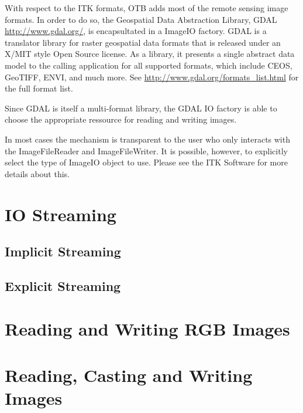 With respect to the ITK formats, OTB adds most of the remote sensing
image formats. In order to do so, the Geospatial Data Abstraction Library, GDAL
      \url{http://www.gdal.org/}, is encapsultated in a ImageIO
      factory. GDAL is a translator library for raster
      geospatial data formats that is released under an X/MIT style
      Open Source license. As a library, it presents a single abstract
      data model to the calling application for all supported formats,
      which include CEOS, GeoTIFF, ENVI, and much more. See
      \url{http://www.gdal.org/formats_list.html} for
      the full format list.

      Since GDAL is itself a multi-format library, the GDAL IO
factory is able to choose the appropriate ressource for reading and
writing images. 

In most cases the mechanism is transparent to the user who only interacts
with the ImageFileReader and ImageFileWriter. It is
possible, however, to explicitly select the type of ImageIO object
to use.  Please see the ITK Software for more details about this.

%

\section{IO Streaming}
\label{sec:IOStreaming}
\subsection{Implicit Streaming}
\label{sec:ImplicitIOStreaming}


\subsection{Explicit Streaming}
\label{sec:ExplicitIOStreaming}



\section{Reading and Writing RGB Images}
\label{sec:RGBImagReadWrite}


\section{Reading, Casting and Writing Images}
\label{sec:ImagReadCastWrite}


